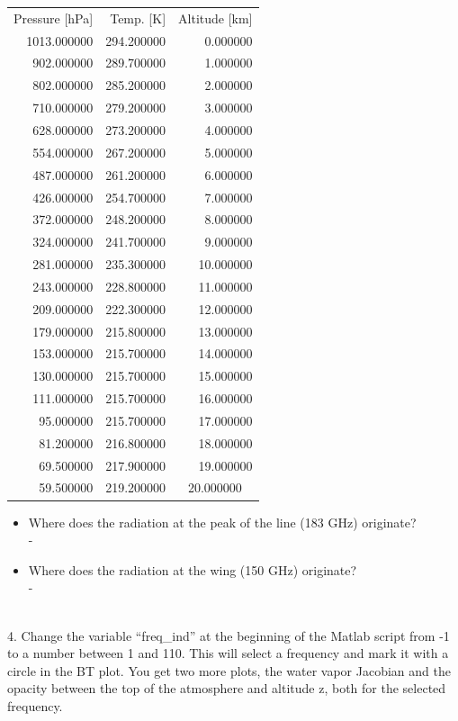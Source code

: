 \documentclass[paper=a4, fontsize=11pt]{scrartcl} %
\begin{document}
\begin{tabular}{rrr}
Pressure [hPa] & Temp. [K] & Altitude [km] \\
1013.000000 &	294.200000 &	0.000000 \\
902.000000 &	289.700000 &	1.000000 \\
802.000000 &	285.200000 &	2.000000 \\
710.000000 &	279.200000 &	3.000000 \\
628.000000 &	273.200000 &	4.000000 \\
554.000000 &	267.200000 &	5.000000 \\
487.000000 &	261.200000 &	6.000000 \\
426.000000 &	254.700000 &	7.000000 \\
372.000000 &	248.200000 &	8.000000 \\
324.000000 &	241.700000 &	9.000000 \\
281.000000 &	235.300000 &	10.000000 \\
243.000000 &	228.800000 &	11.000000 \\
209.000000 &	222.300000 &	12.000000 \\
179.000000 &	215.800000 &	13.000000 \\
153.000000 &	215.700000 &	14.000000 \\
130.000000 &	215.700000 &	15.000000 \\
111.000000 &	215.700000 &	16.000000 \\
95.000000 &	215.700000 &	17.000000 \\
81.200000 &	216.800000 &	18.000000 \\
69.500000 &	217.900000 &	19.000000 \\
59.500000 &	219.200000 &	20.000000 \ \\
\end{tabular}

\begin{itemize} 
	\item Where does the radiation at the peak of the line (183 GHz) originate?\ \\ -

	\item Where does the radiation at the wing (150 GHz) originate?\ \\ - 
\end{itemize}

\ \\4. Change the variable ``freq\_ind'' at the beginning of the Matlab script from -1 to a number between 1 and 110. 
This will select a frequency and mark it with a circle in the BT plot. You get two more plots, the water vapor Jacobian and the opacity between 
the top of the atmosphere and altitude z, both for the selected frequency. \ \\
\end{document}

